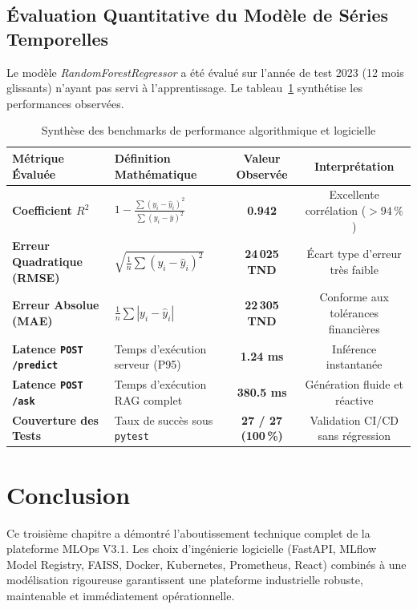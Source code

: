 \documentclass[11pt,a4paper,oneside]{report}
\begin{document}
\subsection{Évaluation Quantitative du Modèle de Séries Temporelles}
Le modèle \textit{RandomForestRegressor} a été évalué sur l'année de test 2023 (12 mois glissants) n'ayant pas servi à l'apprentissage. Le tableau~\ref{tab:benchmarks_final} synthétise les performances observées.

\begin{table}[H]
\centering
\small
{}
\begin{tabularx}{\textwidth}{@{}p{3.8cm}p{4.2cm}cc@{}}
\toprule
\textbf{Métrique Évaluée} & \textbf{Définition Mathématique} & \textbf{Valeur Observée} & \textbf{Interprétation} \\ \midrule
\textbf{Coefficient $R^2$} & $1 - \frac{\sum (y_i - \hat{y}_i)^2}{\sum (y_i - \bar{y})^2}$ & \textbf{0.942} & Excellente corrélation ($>94\,\%$) \\
\textbf{Erreur Quadratique (RMSE)} & $\sqrt{\frac{1}{n} \sum (y_i - \hat{y}_i)^2}$ & \textbf{24\,025 TND} & Écart type d'erreur très faible \\
\textbf{Erreur Absolue (MAE)} & $\frac{1}{n} \sum |y_i - \hat{y}_i|$ & \textbf{22\,305 TND} & Conforme aux tolérances financières \\
\textbf{Latence \texttt{POST /predict}} & Temps d'exécution serveur (P95) & \textbf{1.24 ms} & Inférence instantanée \\
\textbf{Latence \texttt{POST /ask}} & Temps d'exécution RAG complet & \textbf{380.5 ms} & Génération fluide et réactive \\
\textbf{Couverture des Tests} & Taux de succès sous \texttt{pytest} & \textbf{27 / 27 (100\,\%)} & Validation CI/CD sans régression \\ \bottomrule
\end{tabularx}
\caption{Synthèse des benchmarks de performance algorithmique et logicielle}
\label{tab:benchmarks_final}
\end{table}

\section{Conclusion}
Ce troisième chapitre a démontré l'aboutissement technique complet de la plateforme MLOps V3.1. Les choix d'ingénierie logicielle (FastAPI, MLflow Model Registry, FAISS, Docker, Kubernetes, Prometheus, React) combinés à une modélisation rigoureuse garantissent une plateforme industrielle robuste, maintenable et immédiatement opérationnelle.
\end{document}

